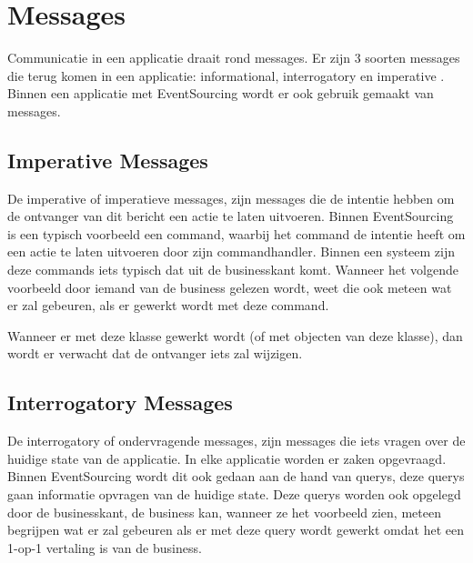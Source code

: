 
\section{Messages}
\label{sec:messages}

Communicatie in een applicatie draait rond messages. Er zijn 3 soorten messages die terug komen in een applicatie: informational, interrogatory en imperative \autocite{Verraes2015Messages}.
Binnen een applicatie met EventSourcing wordt er ook gebruik gemaakt van messages.

\subsection{Imperative Messages}
\label{subsec:imperative-messages}

De imperative of imperatieve messages, zijn messages die de intentie hebben om de ontvanger van dit bericht een actie te laten uitvoeren.
Binnen EventSourcing is een typisch voorbeeld een \Gls{command}, waarbij het \Gls{command} de intentie heeft om een actie te laten uitvoeren door zijn \Gls{commandhandler}. Binnen een systeem zijn deze \Glspl{command} iets typisch dat uit de businesskant komt. Wanneer het volgende voorbeeld door iemand van de business gelezen wordt, weet die ook meteen wat er zal gebeuren, als er gewerkt wordt met deze \Gls{command}.


Wanneer er met deze klasse gewerkt wordt (of met objecten van deze klasse), dan wordt er verwacht dat de ontvanger iets zal wijzigen.

\subsection{Interrogatory Messages}
\label{subsec:interrogatory-messages}

De interrogatory of ondervragende messages, zijn messages die iets vragen over de huidige state van de applicatie. In elke applicatie worden er zaken opgevraagd. Binnen EventSourcing wordt dit ook gedaan aan de hand van \Glspl{query}, deze \Glspl{query} gaan informatie opvragen van de huidige state. Deze \Glspl{query} worden ook opgelegd door de businesskant, de business kan, wanneer ze het voorbeeld zien, meteen begrijpen wat er zal gebeuren als er met deze \Gls{query} wordt gewerkt omdat het een 1-op-1 vertaling is van de business.

